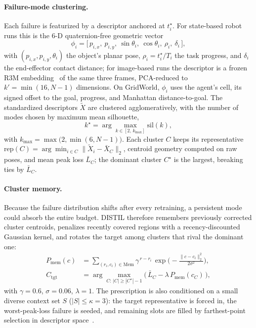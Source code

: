 \documentclass[letterpaper]{article} %
\begin{document}
\paragraph{Failure-mode clustering.}
Each failure is featurized by a descriptor anchored at $t^\star_i$. For
state-based robot runs this is the 6-D quaternion-free geometric vector
\begin{equation}
\phi_i=\big[\,p_{i,x},\ p_{i,y},\ \sin\theta_i,\ \cos\theta_i,\
\rho_i,\ \delta_i\,\big],
\label{eq:desc}
\end{equation}
with $(p_{i,x},p_{i,y},\theta_i)$ the object's planar pose,
$\rho_i=t^\star_i/T_i$ the task progress, and $\delta_i$ the end-effector
contact distance; for image-based runs the descriptor is a frozen R3M
embedding~\citep{nair2022r3m} of the same three frames, PCA-reduced to
$k'=\min(16,N{-}1)$ dimensions. On GridWorld, $\phi_i$ uses the agent's cell,
its signed offset to the goal, progress, and Manhattan distance-to-goal. The
standardized descriptors $\tilde X$ are clustered agglomeratively, with the
number of modes chosen by maximum mean silhouette,
\begin{equation}
k^\star=\arg\max_{k\in[2,\,k_{\max}]}\mathrm{sil}(k),
\label{eq:kstar}
\end{equation}
with $k_{\max}=\max\big(2,\min(6,N{-}1)\big)$.
Each cluster $C$ keeps its representative
$\mathrm{rep}(C)=\arg\min_{i\in C}\|\tilde X_i-\bar X_C\|_2$, centroid
geometry computed on raw poses, and mean peak loss $\bar L_C$; the dominant
cluster $C^\star$ is the largest, breaking ties by $\bar L_C$.

\paragraph{Cluster memory.}
Because the failure distribution shifts after every retraining, a persistent
mode could absorb the entire budget. DISTIL therefore remembers previously
corrected cluster centroids, penalizes recently covered regions with a
recency-discounted Gaussian kernel, and rotates the target among clusters
that rival the dominant one:
\begin{align}
P_{\mathrm{mem}}(c)&=
\sum_{(r_i,c_i)\in\mathrm{Mem}}
\gamma^{\,r-r_i}\,
\exp\!\Big(-\tfrac{\|c-c_i\|_2^2}{2\sigma^2}\Big),
\nonumber\\
C_{\mathrm{tgt}}&=\arg\max_{C:\,|C|\ge|C^\star|-1}
\big(\,\bar L_C-\lambda\,P_{\mathrm{mem}}(c_C)\,\big),
\label{eq:memory}
\end{align}
with $\gamma{=}0.6$, $\sigma{=}0.06$, $\lambda{=}1$. The prescription is
also conditioned on a small diverse context set $S$
($|S|\le\kappa{=}3$): the target representative is forced in, the
worst-peak-loss failure is seeded, and remaining slots are filled by
farthest-point selection in descriptor
space~\citep{sener2018coreset,eldar1997fps}.
\end{document}
